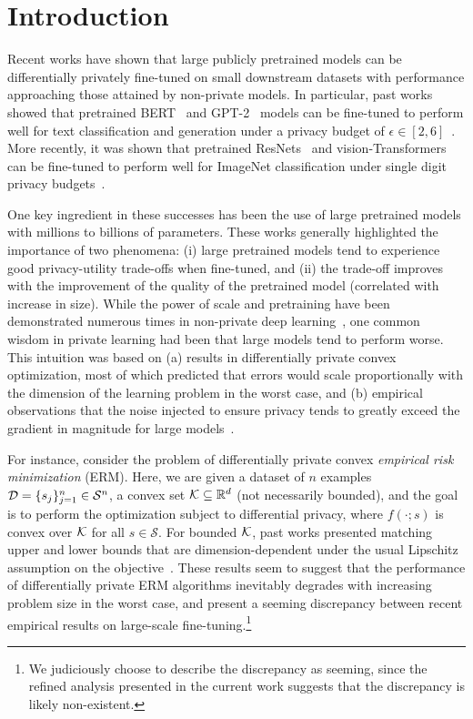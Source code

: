 \section{Introduction}

Recent works have shown that large publicly pretrained models can be differentially privately fine-tuned on small downstream datasets with performance approaching those attained by non-private models. 
In particular, past works showed that pretrained BERT~\cite{devlin2018bert} and GPT-2~\cite{radford2018improving,radford2019language} models can be fine-tuned to perform well for text classification and generation under a privacy budget of $\epsilon \in [2, 6]$~\cite{li2021large,yu2021differentially}. 
More recently, it was shown that pretrained ResNets~\cite{he2016deep} and vision-Transformers~\cite{dosovitskiy2020image} can be fine-tuned to perform well for ImageNet classification under single digit privacy budgets~\cite{de2022unlocking,mehta2022large}. 

One key ingredient in these successes has been the use of large pretrained models with millions to billions of parameters. 
These works generally highlighted the importance of two phenomena: (i) large pretrained models tend to experience good privacy-utility trade-offs when fine-tuned, and (ii) the trade-off improves with the improvement of the quality of the pretrained model (correlated with increase in size).
While the power of scale and pretraining have been demonstrated numerous times in non-private deep learning~\cite{kaplan2020scaling}, one common wisdom in private learning had been that large models tend to perform worse.
This intuition was based on (a) results in differentially private convex optimization, most of which predicted that errors would scale proportionally with the dimension of the learning problem in the worst case, and (b) empirical observations that the noise injected to ensure privacy tends to greatly exceed the gradient in magnitude for large models~\cite{yu2021not,gautum14}. 

For instance, consider the problem of differentially private convex \emph{empirical risk minimization} (ERM).
Here, we are given a dataset of $n$ examples $\mathcal D = \{s_j\}_{j=1}^n \in \mathcal{S}^{n}$, a convex set $\mathcal K \subseteq \mathbb{R}^{d}$ (not necessarily bounded), and the goal is to perform the optimization
subject to differential privacy, 
where $f(\cdot;s)$ is convex over $\mathcal K$ for all $s\in \mathcal{S}$. 
For bounded $\mathcal K$, past works presented matching upper and lower bounds that are dimension-dependent under the usual Lipschitz assumption on the objective~\cite{bassily2014private,chaudhuri2011differentially}.
These results seem to suggest that the performance of differentially private ERM algorithms inevitably degrades with increasing problem size in the worst case, and present a seeming discrepancy between recent empirical results on large-scale fine-tuning.\footnote{We judiciously choose to describe the discrepancy as seeming, since the refined analysis presented in the current work suggests that the discrepancy is likely non-existent.}

